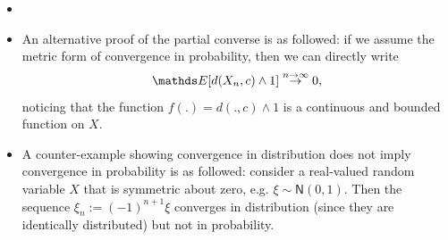 \begin{remark}
\begin{itemize}
\item[]
\item An alternative proof of the partial converse is as followed: if we assume the metric form of convergence in probability, then we can directly write 
\begin{equation}
    \E[d(X_n, c) \wedge 1] \overset{n\to\infty}{\to} 0,
\end{equation}
noticing that the function $f(.) = d(.,c) \wedge 1$ is a continuous and bounded function on $X$.
\item A counter-example showing convergence in distribution does not imply convergence in probability is as followed: consider a real-valued random variable $X$ that is symmetric about zero, e.g. $\xi \sim \mathsf{N}(0,1)$. Then the sequence $\xi_n := (-1)^{n+1}\xi$ converges in distribution (since they are identically distributed) but not in probability.
\end{itemize}
\end{remark}

